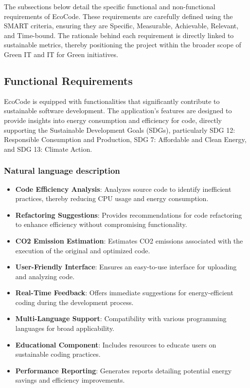 \documentclass[conference,compsoc]{IEEEtran}
\begin{document}
The subsections below detail the specific functional and non-functional requirements of EcoCode. These requirements are carefully defined using the SMART criteria, ensuring they are Specific, Measurable, Achievable, Relevant, and Time-bound. The rationale behind each requirement is directly linked to sustainable metrics, thereby positioning the project within the broader scope of Green IT and IT for Green initiatives.

\subsection{Functional Requirements}
EcoCode is equipped with functionalities that significantly contribute to sustainable software development. The application's features are designed to provide insights into energy consumption and efficiency for  code, directly supporting the Sustainable Development Goals (SDGs), particularly SDG 12: Responsible Consumption and Production, SDG 7: Affordable and Clean Energy, and SDG 13: Climate Action.

\subsubsection{Natural language description}
\begin{itemize}
    \item \textbf{Code Efficiency Analysis}: Analyzes source code to identify inefficient practices, thereby reducing CPU usage and energy consumption.
    \item \textbf{Refactoring Suggestions}: Provides recommendations for code refactoring to enhance efficiency without compromising functionality.
    \item \textbf{CO2 Emission Estimation}: Estimates CO2 emissions associated with the execution of the original and optimized code.
    \item \textbf{User-Friendly Interface}: Ensures an easy-to-use interface for uploading and analyzing code.
    \item \textbf{Real-Time Feedback}: Offers immediate suggestions for energy-efficient coding during the development process.
    \item \textbf{Multi-Language Support}: Compatibility with various programming languages for broad applicability.
    \item \textbf{Educational Component}: Includes resources to educate users on sustainable coding practices.
    \item \textbf{Performance Reporting}: Generates reports detailing potential energy savings and efficiency improvements.
\end{itemize}
\end{document}
